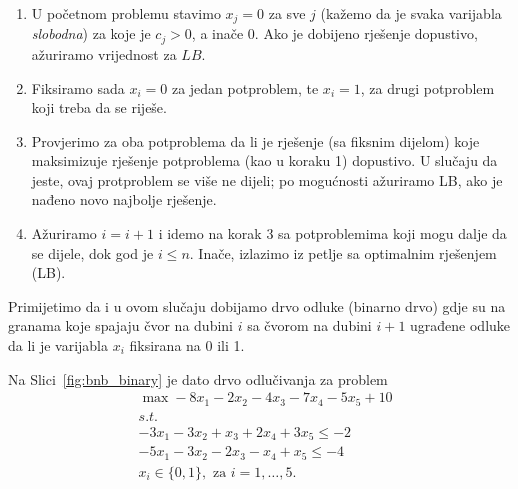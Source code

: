 \documentclass[a4paper, utf8, 11pt, colorlinks]{book}
\begin{document}
\begin{enumerate}
    \item U početnom problemu  stavimo $x_j=0$ za sve $j$ (kažemo da je svaka varijabla \emph{slobodna}) za koje je $c_j > 0$, a inače 0. Ako je dobijeno rješenje dopustivo, ažuriramo vrijednost za $LB$.
    \item Fiksiramo sada $x_i=0$ za jedan potproblem, te $x_i=1$, za drugi potproblem koji treba da se riješe.
    
    \item  Provjerimo za oba potproblema da li je rješenje (sa fiksnim dijelom) koje maksimizuje rješenje potproblema (kao u koraku 1) dopustivo. U slučaju da jeste,   ovaj protproblem se više ne dijeli; po mogućnosti ažuriramo LB, ako je nađeno novo najbolje rješenje.   %
    \item Ažuriramo $i = i+1$ i idemo na korak 3 sa potproblemima koji mogu dalje da se dijele, dok god je $i \leq n$. Inače, izlazimo iz petlje sa optimalnim rješenjem (LB). 
\end{enumerate}
 Primijetimo da i u ovom slučaju dobijamo drvo odluke (binarno drvo) gdje su na granama koje spajaju čvor na dubini $i$ sa čvorom na dubini $i+1$  ugrađene odluke da li je varijabla $x_i$ fiksirana na 0 ili 1.

Na Slici~\ref{fig:bnb_binary} je dato drvo odlučivanja za problem 
\begin{align*}
   &\max -8 x_1 - 2x_2 - 4x_3 - 7x_4 -5x_5 + 10 \\
   & s.t. \\
   & -3 x_1 - 3 x_2 + x_3 + 2 x_4 + 3 x_5 \leq -2 \\
   & -5 x_1 - 3 x_2 - 2 x_3 - x_4 + x_5 \leq -4 \\
   & x_i \in \{0, 1\}, \mbox{ za } i=1,\ldots,5.
\end{align*}

\end{document}
